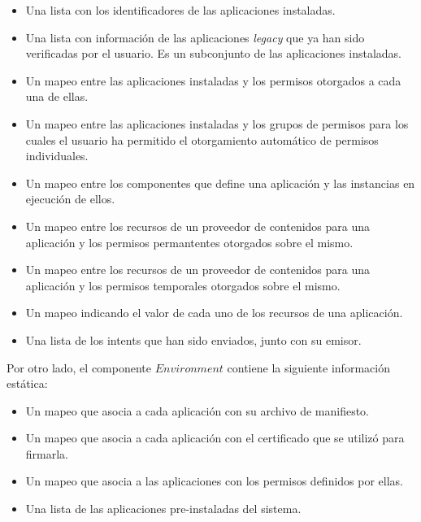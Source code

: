 \begin{itemize}
    \item Una lista con los identificadores de las aplicaciones instaladas.
    \item Una lista con información de las aplicaciones \textit{legacy} que ya han sido verificadas
          por el usuario. Es un subconjunto de las aplicaciones instaladas.
    \item Un mapeo entre las aplicaciones instaladas y los permisos otorgados a cada una de ellas.
    \item Un mapeo entre las aplicaciones instaladas y los grupos de permisos para los cuales el
          usuario ha permitido el otorgamiento automático de permisos individuales.
    \item Un mapeo entre los componentes que define una aplicación y las instancias en ejecución de
          ellos.
    \item Un mapeo entre los recursos de un proveedor de contenidos para una aplicación y los
          permisos permantentes otorgados sobre el mismo.
    \item Un mapeo entre los recursos de un proveedor de contenidos para una aplicación y los
          permisos temporales otorgados sobre el mismo.
    \item Un mapeo indicando el valor de cada uno de los recursos de una aplicación.
    \item Una lista de los intents que han sido enviados, junto con su emisor.
\end{itemize}

Por otro lado, el componente $Environment$ contiene la siguiente información estática:

\begin{itemize}
    \item Un mapeo que asocia a cada aplicación con su archivo de manifiesto.
    \item Un mapeo que asocia a cada aplicación con el certificado que se utilizó para firmarla.
    \item Un mapeo que asocia a las aplicaciones con los permisos definidos por ellas.
    \item Una lista de las aplicaciones pre-instaladas del sistema.
\end{itemize}

